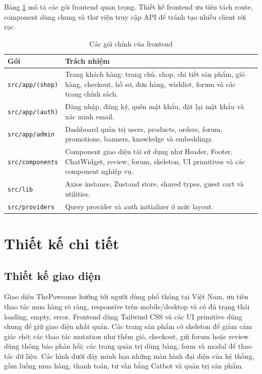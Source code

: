 \documentclass[../DoAn.tex]{subfiles}
\begin{document}
Bảng \ref{table:4.2} mô tả các gói frontend quan trọng. Thiết kế frontend ưu tiên tách route, component dùng chung và thư viện truy cập API để tránh tạo nhiều client rời rạc.

\begin{table}[H]
\centering
\small
\renewcommand{\arraystretch}{1.25}
\caption{Các gói chính của frontend}
\label{table:4.2}
\begin{tabular}{|p{3.2cm}|p{10.8cm}|}
\hline
\textbf{Gói} & \textbf{Trách nhiệm} \\ \hline
\texttt{src/app/(shop)} & Trang khách hàng: trang chủ, shop, chi tiết sản phẩm, giỏ hàng, checkout, hồ sơ, đơn hàng, wishlist, forum và các trang chính sách. \\ \hline
\texttt{src/app/(auth)} & Đăng nhập, đăng ký, quên mật khẩu, đặt lại mật khẩu và xác minh email. \\ \hline
\texttt{src/app/admin} & Dashboard quản trị users, products, orders, forum, promotions, banners, knowledge và embeddings. \\ \hline
\texttt{src/components} & Component giao diện tái sử dụng như Header, Footer, ChatWidget, review, forum, skeleton, UI primitives và các component nghiệp vụ. \\ \hline
\texttt{src/lib} & Axios instance, Zustand store, shared types, guest cart và utilities. \\ \hline
\texttt{src/providers} & Query provider và auth initializer ở mức layout. \\ \hline
\end{tabular}
\end{table}

\section{Thiết kế chi tiết}
\label{section:4.2}

\subsection{Thiết kế giao diện}
\label{subsection:4.2.1}

Giao diện ThePawsome hướng tới người dùng phổ thông tại Việt Nam, ưu tiên thao tác mua hàng rõ ràng, responsive trên mobile/desktop và có đủ trạng thái loading, empty, error. Frontend dùng Tailwind CSS và các UI primitive dùng chung để giữ giao diện nhất quán. Các trang sản phẩm có skeleton để giảm cảm giác chờ; các thao tác mutation như thêm giỏ, checkout, gửi forum hoặc review dùng thông báo phản hồi; các trang quản trị dùng bảng, form và modal để thao tác dữ liệu. Các hình dưới đây minh họa những màn hình đại diện của hệ thống, gồm luồng mua hàng, thanh toán, tư vấn bằng Catbot và quản trị sản phẩm.
\end{document}
